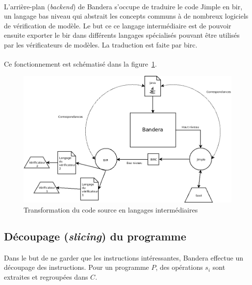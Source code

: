 \paragraph{}
L'arrière-plan (\textit{backend}) de Bandera s'occupe de traduire le
code Jimple en \gls{bir}, un langage bas niveau qui abstrait les
concepts communs à de nombreux logiciels de vérification de modèle. Le
but ce ce langage intermédiaire est de pouvoir ensuite exporter le
\gls{bir} dans différents langages spécialisés pouvant être utilisés
par les vérificateurs de modèles. La traduction est faite par
\gls{birc}.

\paragraph{}
Ce fonctionnement est schématisé dans la figure~\ref{fig:bir_jimple}.

\begin{figure}[H]
  \centering
  \includegraphics[scale=0.5]{images/bandera_bir_jimple.png}
  \caption{\label{fig:bir_jimple} Transformation du code source en
    langages intermédiaires}
\end{figure}


\subsection{Découpage (\textit{slicing}) du programme}
\label{sec:bandera_slicing}

\paragraph{}
Dans le but de ne garder que les instructions intéressantes, Bandera
effectue un découpage des instructions. Pour un programme $P$, des
opérations $s_i$ sont extraites et regroupées dans $C$.

